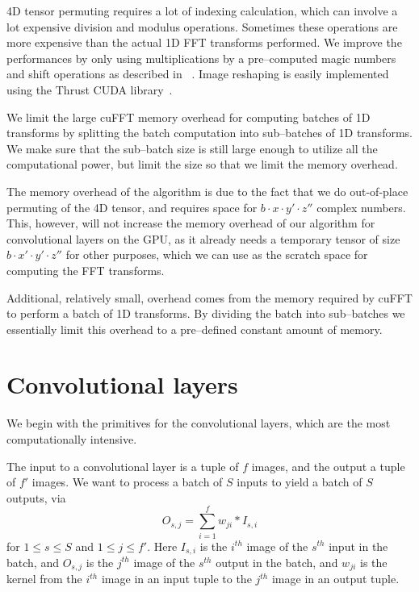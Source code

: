 \documentclass[conference]{./IEEEtran/IEEEtran}
\begin{document}
  4D tensor permuting requires a lot of indexing calculation, which
  can involve a lot expensive division and modulus operations.
  Sometimes these operations are more expensive than the actual 1D FFT
  transforms performed.  We improve the performances by only using
  multiplications by a pre--computed magic numbers and shift
  operations as described in ~\cite{warren2013hacker}.  Image
  reshaping is easily implemented using the Thrust CUDA
  library~\cite{bell2011thrust}.

  We limit the large cuFFT memory overhead for computing batches of 1D
  transforms by splitting the batch computation into sub--batches of
  1D transforms.  We make sure that the sub--batch size is still large
  enough to utilize all the computational power, but limit the size so
  that we limit the memory overhead.

  The memory overhead of the algorithm is due to the fact that we do
  out-of-place permuting of the 4D tensor, and requires space for $b
  \cdot x \cdot y' \cdot z''$ complex numbers.  This, however, will
  not increase the memory overhead of our algorithm for convolutional
  layers on the GPU, as it already needs a temporary tensor of size $b
  \cdot x' \cdot y' \cdot z''$ for other purposes, which we can use as
  the scratch space for computing the FFT transforms.

  Additional, relatively small, overhead comes from the memory
  required by cuFFT to perform a batch of 1D transforms.  By dividing
  the batch into sub--batches we essentially limit this overhead to a
  pre--defined constant amount of memory.


\section{Convolutional layers}

  We begin with the primitives for the convolutional layers, which are
  the most computationally intensive.

  The input to a convolutional layer is a tuple of $f$ images, and the
  output a tuple of $f'$ images.  We want to process a batch of $S$
  inputs to yield a batch of $S$ outputs, via
  \[
  O_{s,j} = \sum_{i=1}^f w_{ji}\ast I_{s,i}
  \]
  for $1 \le s \le S$ and $1 \le j \le f'$.  Here $I_{s,i}$ is the
  $i^{th}$ image of the $s^{th}$ input in the batch, and $O_{s,j}$ is
  the $j^{th}$ image of the $s^{th}$ output in the batch, and $w_{ji}$
  is the kernel from the $i^{th}$ image in an input tuple to the
  $j^{th}$ image in an output tuple.
\end{document}
